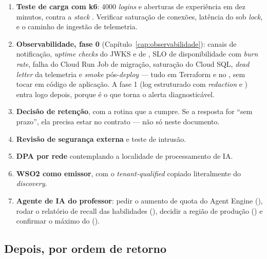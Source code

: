 \begin{enumerate}
  \item \textbf{Teste de carga com k6}: \num{4000} \emph{logins} e aberturas de
    experiência em dez minutos, contra a \emph{stack} . Verificar
    saturação de conexões, latência do  sob \emph{lock}, e o
    caminho de ingestão de telemetria.
  \item \textbf{Observabilidade, fase 0} (Capítulo~\ref{cap:observabilidade}):
    canais de notificação, \emph{uptime checks} do JWKS e de ,
    SLO de disponibilidade com \emph{burn rate}, falha do Cloud Run Job de
    migração, saturação do Cloud SQL, \emph{dead letter} da telemetria e
    \emph{smoke} pós-\emph{deploy} --- tudo em Terraform e no
    , sem tocar em código de aplicação. A fase 1 (log
    estruturado com \emph{redaction} e ) entra logo
    depois, porque é o que torna o alerta diagnosticável.
  \item \textbf{Decisão de retenção}, com a rotina que a cumpre. Se a resposta for
    \enquote{sem prazo}, ela precisa estar no contrato --- não só neste documento.
  \item \textbf{Revisão de segurança externa} e teste de intrusão.
  \item \textbf{DPA por rede} contemplando a localidade de processamento de IA.
  \item \textbf{WSO2 como emissor}, com o  \emph{tenant-qualified} copiado
    literalmente do \emph{discovery}.
  \item \textbf{Agente de IA do professor}: pedir o aumento de quota do Agent
    Engine (), rodar o relatório de recall das habilidades (),
    decidir a região de produção () e confirmar o máximo do
     ().
\end{enumerate}

\subsection{Depois, por ordem de retorno}

